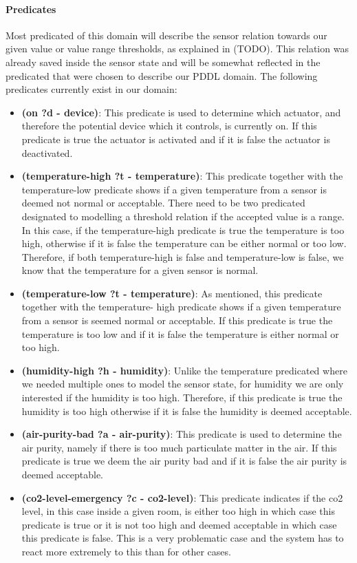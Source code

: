 \documentclass[runningheads]{llncs}
\begin{document}
    \paragraph{Predicates}
    Most predicated of this domain will describe the sensor relation towards our given value or value range thresholds, as explained in (TODO). This relation was already saved inside the sensor state and will be somewhat reflected in the predicated that were chosen to describe our PDDL domain. The following predicates currently exist in our domain:
    \begin{itemize}
        \item \textbf{(on ?d - device)}: This predicate is used to determine which actuator, and therefore the potential device which it controls, is currently on. If this predicate is true the actuator is activated and if it is false the actuator is deactivated. 
        \item \textbf{(temperature-high ?t - temperature)}: This predicate together with the temperature-low predicate shows if a given temperature from a sensor is deemed not normal or acceptable. There need to be two predicated designated to modelling a threshold relation if the accepted value is a range. In this case, if the temperature-high predicate is true the temperature is too high, otherwise if it is false the temperature can be either normal or too low. Therefore, if both temperature-high is false and temperature-low is false, we know that the temperature for a given sensor is normal. 
        \item \textbf{(temperature-low ?t - temperature)}: As mentioned, this predicate together with the temperature- high predicate shows if a given temperature from a sensor is seemed normal or acceptable. If this predicate is true the temperature is too low and if it is false the temperature is either normal or too high. 
        \item \textbf{(humidity-high ?h - humidity)}: Unlike the temperature predicated where we needed multiple ones to model the sensor state, for humidity we are only interested if the humidity is too high. Therefore, if this predicate is true the humidity is too high otherwise if it is false the humidity is deemed acceptable. 
        \item \textbf{(air-purity-bad ?a - air-purity)}: This predicate is used to determine the air purity, namely if there is too much particulate matter in the air. If this predicate is true we deem the air purity bad and if it is false the air purity is deemed acceptable.
        \item \textbf{(co2-level-emergency ?c - co2-level)}: This predicate indicates if the co2 level, in this case inside a given room, is either too high in which case this predicate is true or it is not too high and deemed acceptable in which case this predicate is false. This is a very problematic case and the system has to react more extremely to this than for other cases. 
    \end{itemize}
\end{document}
